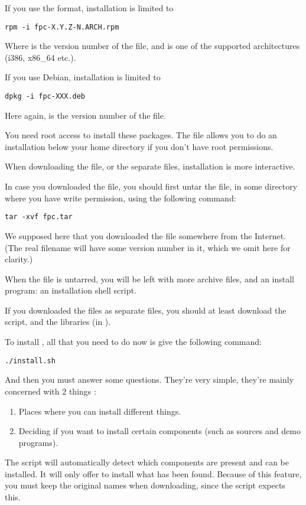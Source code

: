 If you use the  format, installation is limited to
\begin{verbatim}
rpm -i fpc-X.Y.Z-N.ARCH.rpm
\end{verbatim}
Where  is the version number of the  file,
and  is one of the supported architectures (i386, x86\_64 etc.).

If you use Debian, installation is limited to
\begin{verbatim}
dpkg -i fpc-XXX.deb
\end{verbatim}
Here again,  is the version number of the  file.

You need root access to install these packages. The  file
allows you to do an installation below your home directory if you
don't have root permissions.

When downloading the  file, or the separate files,
installation is more interactive.

In case you downloaded the  file, you should first untar
the file, in some directory where
you have write permission, using the following command:
\begin{verbatim}
tar -xvf fpc.tar
\end{verbatim}
We supposed here that you downloaded the file  somewhere
from the Internet. (The real filename will have some version number in it,
which we omit here for clarity.)

When the file is untarred, you will be left with more archive files, and
an install program: an installation shell script.

If you downloaded the files as separate files, you should at least download
the  script, and the libraries (in ).

To install \fpc, all that you need to do now is give the following command:
\begin{verbatim}
./install.sh
\end{verbatim}
And then you must answer some questions. They're very simple, they're
mainly concerned with 2 things :
\begin{enumerate}
\item Places where you can install different things.
\item Deciding if you want to install certain components (such as sources
and demo programs).
\end{enumerate}
The script will automatically detect which components are present and can be
installed. It will only offer to install what has been found.
Because of this feature, you must keep the original names when downloading,
since the script expects this.

